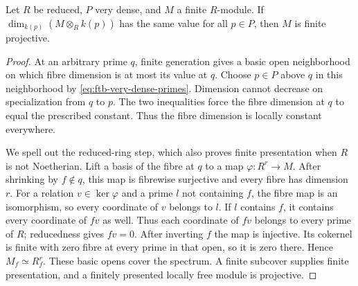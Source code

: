 \begin{srlemma}
\label{lem:ftb-very-dense-projective}
Let \(R\) be reduced, \(P\) very dense, and \(M\) a finite
\(R\)-module.
If \(\dim_{k(p)}(M\otimes_Rk(p))\) has the same value for
all \(p\in P\), then \(M\) is finite projective.
\end{srlemma}
\begin{proof}
At an arbitrary prime \(q\), finite generation gives a
basic open neighborhood on which fibre dimension is at
most its value at \(q\).
Choose \(p\in P\) above \(q\) in this neighborhood by
\eqref{eq:ftb-very-dense-primes}.
Dimension cannot decrease on specialization from \(q\)
to \(p\).
The two inequalities force the fibre dimension at \(q\)
to equal the prescribed constant.
Thus the fibre dimension is locally constant everywhere.

We spell out the reduced-ring step, which also proves
finite presentation when \(R\) is not Noetherian.
Lift a basis of the fibre at \(q\) to a map
\(\varphi:R^r\to M\).
After shrinking by \(f\notin q\), this map is fibrewise
surjective and every fibre has dimension \(r\).
For a relation \(v\in\ker\varphi\) and a prime \(l\) not
containing \(f\), the fibre map is an isomorphism, so
every coordinate of \(v\) belongs to \(l\).
If \(l\) contains \(f\), it contains every coordinate of
\(fv\) as well.
Thus each coordinate of \(fv\) belongs to every prime
of \(R\); reducedness gives \(fv=0\).
After inverting \(f\) the map is injective.
Its cokernel is finite with zero fibre at every prime
in that open, so it is zero there.
Hence \(M_f\simeq R_f^r\).
These basic opens cover the spectrum.
A finite subcover supplies finite presentation, and a
finitely presented locally free module is projective.
\end{proof}

